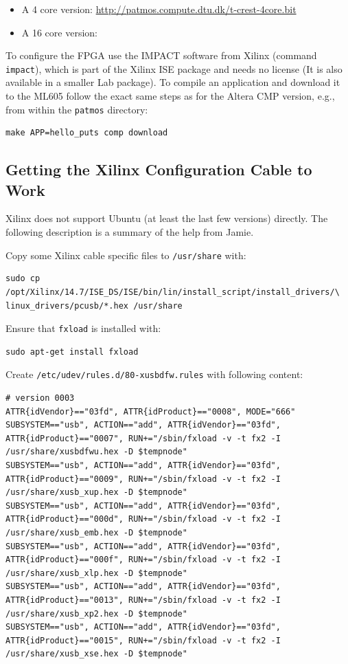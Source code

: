 \documentclass[a4paper,fontsize=10pt,twoside,DIV15,BCOR12mm,headinclude=true,footinclude=false,pagesize,bibtotoc]{scrbook}
\newcommand{\code}[1]{{\texttt{#1}}}
\begin{document}
\begin{itemize}
\item A 4 core version: \url{http://patmos.compute.dtu.dk/t-crest-4core.bit}
\item A 16 core version: 
\end{itemize}

To configure the FPGA use the IMPACT software from Xilinx (command \code{impact}), which is part of the Xilinx ISE package
and needs no license (It is also available in a smaller Lab package). To compile an application and
download it to the ML605 follow the exact same steps as for the Altera CMP version, e.g., from
within the \code{patmos} directory:

\begin{verbatim}
make APP=hello_puts comp download
\end{verbatim}

\subsection{Getting the Xilinx Configuration Cable to Work}

Xilinx does not support Ubuntu (at least the last few versions) directly. The following description
is a summary of the help from Jamie.

Copy some Xilinx cable specific files to \code{/usr/share} with:

\begin{verbatim}
sudo cp /opt/Xilinx/14.7/ISE_DS/ISE/bin/lin/install_script/install_drivers/\
linux_drivers/pcusb/*.hex /usr/share
\end{verbatim}
 
Ensure that \code{fxload} is installed with:
\begin{verbatim} 
sudo apt-get install fxload
\end{verbatim}

Create \code{/etc/udev/rules.d/80-xusbdfw.rules} with following content:

\begin{tiny}
\begin{verbatim}
# version 0003
ATTR{idVendor}=="03fd", ATTR{idProduct}=="0008", MODE="666"
SUBSYSTEM=="usb", ACTION=="add", ATTR{idVendor}=="03fd", ATTR{idProduct}=="0007", RUN+="/sbin/fxload -v -t fx2 -I /usr/share/xusbdfwu.hex -D $tempnode"
SUBSYSTEM=="usb", ACTION=="add", ATTR{idVendor}=="03fd", ATTR{idProduct}=="0009", RUN+="/sbin/fxload -v -t fx2 -I /usr/share/xusb_xup.hex -D $tempnode"
SUBSYSTEM=="usb", ACTION=="add", ATTR{idVendor}=="03fd", ATTR{idProduct}=="000d", RUN+="/sbin/fxload -v -t fx2 -I /usr/share/xusb_emb.hex -D $tempnode"
SUBSYSTEM=="usb", ACTION=="add", ATTR{idVendor}=="03fd", ATTR{idProduct}=="000f", RUN+="/sbin/fxload -v -t fx2 -I /usr/share/xusb_xlp.hex -D $tempnode"
SUBSYSTEM=="usb", ACTION=="add", ATTR{idVendor}=="03fd", ATTR{idProduct}=="0013", RUN+="/sbin/fxload -v -t fx2 -I /usr/share/xusb_xp2.hex -D $tempnode"
SUBSYSTEM=="usb", ACTION=="add", ATTR{idVendor}=="03fd", ATTR{idProduct}=="0015", RUN+="/sbin/fxload -v -t fx2 -I /usr/share/xusb_xse.hex -D $tempnode"
\end{verbatim}
\end{tiny}
\end{document}
